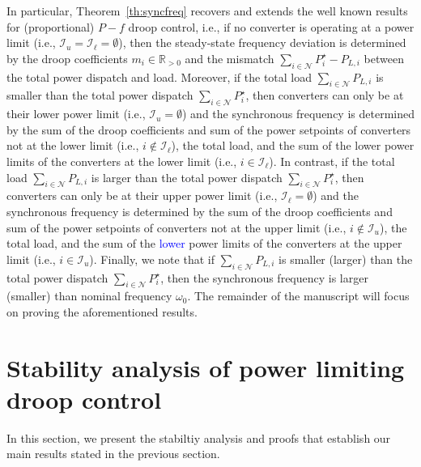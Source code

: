 \documentclass[twocolumn,twoside,journal]{IEEEtran}
\newcommand{\mc}{\mathcal}
\begin{document}
In particular, Theorem~\ref{th:syncfreq} recovers and extends the well known results for (proportional) $P-f$ droop control, i.e., if no converter is operating at a power limit (i.e., $\mc I_u = \mc I_\ell = \emptyset$), then the steady-state frequency deviation is determined by the droop coefficients $m_i \in \mathbb{R}_{>0}$ and the mismatch $\sum_{i \in \mc N} P^\star_i - P_{L,i}$ between the total power dispatch and load. Moreover, if the total load $\sum_{i \in \mc N}  P_{L,i}$ is smaller than the total power dispatch $\sum_{i \in \mc N} P^\star_i$, then converters can only be at their lower power limit (i.e., $\mc I_u=\emptyset$) and the synchronous frequency is determined by the sum of the droop coefficients and sum of the power setpoints of converters not at the lower limit (i.e., $i \notin \mc I_\ell$), the total load, and the sum of the lower power limits of the converters at the lower limit (i.e., $i \in \mc I_\ell$). In contrast, if the total load $\sum_{i \in \mc N}  P_{L,i}$ is larger than the total power dispatch  $\sum_{i \in \mc N}  P^\star_i$, then converters can only be at their upper power limit (i.e., $\mc I_\ell=\emptyset$) and the synchronous frequency is determined by the sum of the droop coefficients and sum of the power setpoints of converters not at the upper limit (i.e., $i \notin \mc I_u$), the total load, and the sum of the \textcolor{blue}{lower} power limits of the converters at the upper limit (i.e., $i \in \mc I_u$). Finally, we note that if $\sum_{i \in \mc N}  P_{L,i}$ is smaller (larger) than the total power dispatch  $\sum_{i \in \mc N}  P^\star_i$, then the synchronous frequency is larger (smaller) than nominal frequency $\omega_0$. The remainder of the manuscript will focus on proving the aforementioned results.





\section{Stability analysis of power limiting droop control}
In this section, we present the stabiltiy analysis and proofs that establish our main results stated in the previous section.
\end{document}
